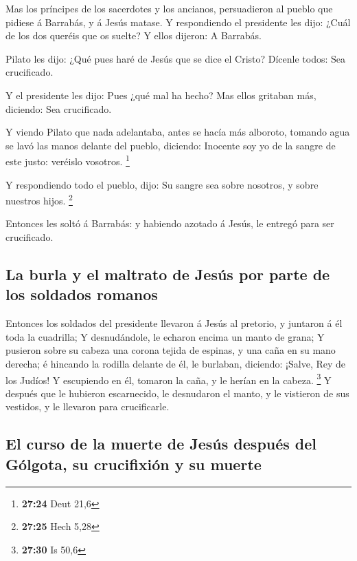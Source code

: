  Mas los príncipes de los sacerdotes y los ancianos,
persuadieron al pueblo que pidiese á Barrabás, y á Jesús matase.
 Y respondiendo el presidente les dijo: ¿Cuál de los dos
queréis que os suelte? Y ellos dijeron: A Barrabás.

 Pilato les dijo: ¿Qué pues haré de Jesús que se dice el
Cristo? Dícenle todos: Sea crucificado.

 Y el presidente les dijo: Pues ¿qué mal ha hecho? Mas
ellos gritaban más, diciendo: Sea crucificado.

 Y viendo Pilato que nada adelantaba, antes se hacía más
alboroto, tomando agua se lavó las manos delante del pueblo, diciendo:
Inocente soy yo de la sangre de este justo: veréislo vosotros.
\footnote{\textbf{27:24} Deut 21,6}

 Y respondiendo todo el pueblo, dijo: Su sangre sea sobre
nosotros, y sobre nuestros hijos. \footnote{\textbf{27:25} Hech 5,28}

 Entonces les soltó á Barrabás: y habiendo azotado á Jesús,
le entregó para ser crucificado.

\hypertarget{la-burla-y-el-maltrato-de-jesuxfas-por-parte-de-los-soldados-romanos}{%
\subsection{La burla y el maltrato de Jesús por parte de los soldados
romanos}\label{la-burla-y-el-maltrato-de-jesuxfas-por-parte-de-los-soldados-romanos}}

 Entonces los soldados del presidente llevaron á Jesús al
pretorio, y juntaron á él toda la cuadrilla;  Y
desnudándole, le echaron encima un manto de grana;  Y
pusieron sobre su cabeza una corona tejida de espinas, y una caña en su
mano derecha; é hincando la rodilla delante de él, le burlaban,
diciendo: ¡Salve, Rey de los Judíos!  Y escupiendo en él,
tomaron la caña, y le herían en la cabeza. \footnote{\textbf{27:30} Is
  50,6}  Y después que le hubieron escarnecido, le
desnudaron el manto, y le vistieron de sus vestidos, y le llevaron para
crucificarle.

\hypertarget{el-curso-de-la-muerte-de-jesuxfas-despuuxe9s-del-guxf3lgota-su-crucifixiuxf3n-y-su-muerte}{%
\subsection{El curso de la muerte de Jesús después del Gólgota, su
crucifixión y su
muerte}\label{el-curso-de-la-muerte-de-jesuxfas-despuuxe9s-del-guxf3lgota-su-crucifixiuxf3n-y-su-muerte}}

